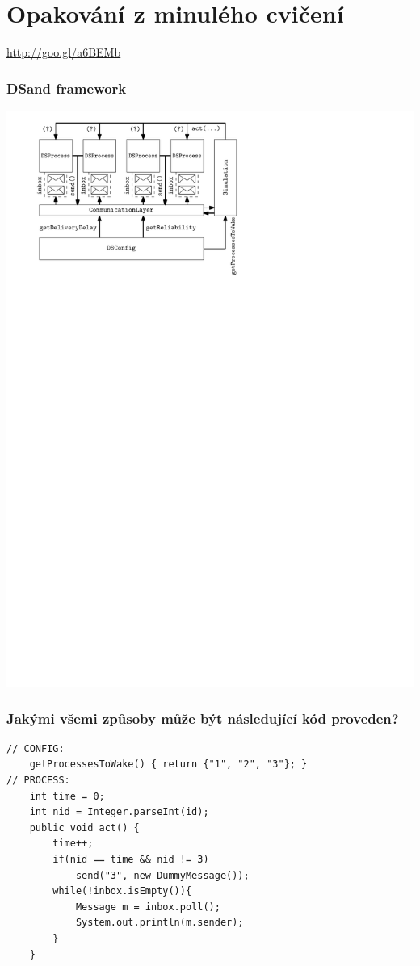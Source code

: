 \documentclass[usenames,dvipsnames,9pt]{beamer}
\begin{document}
\section{Opakování z minulého cvičení}

\begin{frame}[standout]
 \Huge
 \url{http://goo.gl/a6BEMb}
\end{frame}

\begin{frame}
\frametitle{DSand framework}
\centering\includegraphics[width=0.8\linewidth]{10/figs/dsand.pdf}
\end{frame}

{
\begin{frame}[fragile]
\frametitle{Jakými všemi způsoby může být následující kód proveden?}

\begin{verbatim}
// CONFIG:
	getProcessesToWake() { return {"1", "2", "3"}; }
// PROCESS:
	int time = 0;
	int nid = Integer.parseInt(id);
	public void act() {
		time++;
		if(nid == time && nid != 3)
			send("3", new DummyMessage());
		while(!inbox.isEmpty()){
			Message m = inbox.poll();
			System.out.println(m.sender);
		}
	}
\end{verbatim}

\end{frame}
}
\end{document}
